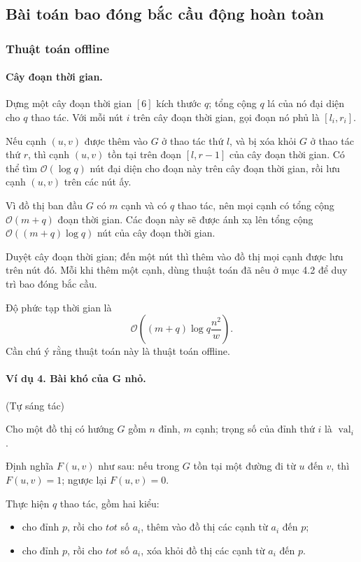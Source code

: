 \documentclass[11pt]{article}
\newcommand{\Oh}{\mathcal{O}}
\begin{document}
\subsection{Bài toán bao đóng bắc cầu động hoàn toàn}

\subsubsection{Thuật toán offline}

\paragraph{Cây đoạn thời gian.}
Dựng một cây đoạn thời gian \([6]\) kích thước \(q\); tổng cộng \(q\) lá của
nó đại diện cho \(q\) thao tác. Với mỗi nút \(i\) trên cây đoạn thời gian, gọi
đoạn nó phủ là \([l_i,r_i]\).

Nếu cạnh \((u,v)\) được thêm vào \(G\) ở thao tác thứ \(l\), và bị xóa khỏi
\(G\) ở thao tác thứ \(r\), thì cạnh \((u,v)\) tồn tại trên đoạn
\([l,r-1]\) của cây đoạn thời gian. Có thể tìm \(\Oh(\log q)\) nút đại diện
cho đoạn này trên cây đoạn thời gian, rồi lưu cạnh \((u,v)\) trên các nút ấy.

Vì đồ thị ban đầu \(G\) có \(m\) cạnh và có \(q\) thao tác, nên mọi cạnh có
tổng cộng \(\Oh(m+q)\) đoạn thời gian. Các đoạn này sẽ được ánh xạ lên tổng
cộng \(\Oh((m+q)\log q)\) nút của cây đoạn thời gian.

Duyệt cây đoạn thời gian; đến một nút thì thêm vào đồ thị mọi cạnh được lưu
trên nút đó. Mỗi khi thêm một cạnh, dùng thuật toán đã nêu ở mục 4.2 để duy
trì bao đóng bắc cầu.

Độ phức tạp thời gian là
\[
  \Oh\left((m+q)\log q\frac{n^2}{w}\right).
\]
Cần chú ý rằng thuật toán này là thuật toán offline.

\paragraph{Ví dụ 4. Bài khó của G nhỏ.}
(Tự sáng tác)

Cho một đồ thị có hướng \(G\) gồm \(n\) đỉnh, \(m\) cạnh; trọng số của đỉnh
thứ \(i\) là \(\operatorname{val}_i\).

Định nghĩa \(F(u,v)\) như sau: nếu trong \(G\) tồn tại một đường đi từ \(u\)
đến \(v\), thì \(F(u,v)=1\); ngược lại \(F(u,v)=0\).

Thực hiện \(q\) thao tác, gồm hai kiểu:
\begin{itemize}
  \item cho đỉnh \(p\), rồi cho \(tot\) số \(a_i\), thêm vào đồ thị các cạnh
  từ \(a_i\) đến \(p\);

  \item cho đỉnh \(p\), rồi cho \(tot\) số \(a_i\), xóa khỏi đồ thị các cạnh
  từ \(a_i\) đến \(p\).
\end{itemize}
\end{document}
